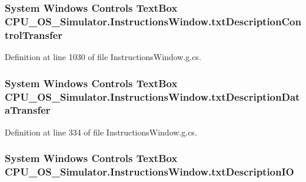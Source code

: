 \subsubsection[{txt\+Description\+Control\+Transfer}]{\setlength{\rightskip}{0pt plus 5cm}System Windows Controls Text\+Box C\+P\+U\+\_\+\+O\+S\+\_\+\+Simulator.\+Instructions\+Window.\+txt\+Description\+Control\+Transfer\hspace{0.3cm}{\ttfamily [package]}}\label{class_c_p_u___o_s___simulator_1_1_instructions_window_af8667a9cb444eb6aaa84349fe194b853}


Definition at line 1030 of file Instructions\+Window.\+g.\+cs.

\hypertarget{class_c_p_u___o_s___simulator_1_1_instructions_window_a58152c12c2022edc73b39c1f95ec7ba4}{}
\subsubsection[{txt\+Description\+Data\+Transfer}]{\setlength{\rightskip}{0pt plus 5cm}System Windows Controls Text\+Box C\+P\+U\+\_\+\+O\+S\+\_\+\+Simulator.\+Instructions\+Window.\+txt\+Description\+Data\+Transfer\hspace{0.3cm}{\ttfamily [package]}}\label{class_c_p_u___o_s___simulator_1_1_instructions_window_a58152c12c2022edc73b39c1f95ec7ba4}


Definition at line 334 of file Instructions\+Window.\+g.\+cs.

\hypertarget{class_c_p_u___o_s___simulator_1_1_instructions_window_a278020eeca6ae302ab5530cca856acde}{}
\subsubsection[{txt\+Description\+I\+O}]{\setlength{\rightskip}{0pt plus 5cm}System Windows Controls Text\+Box C\+P\+U\+\_\+\+O\+S\+\_\+\+Simulator.\+Instructions\+Window.\+txt\+Description\+I\+O\hspace{0.3cm}{\ttfamily [package]}}\label{class_c_p_u___o_s___simulator_1_1_instructions_window_a278020eeca6ae302ab5530cca856acde}


